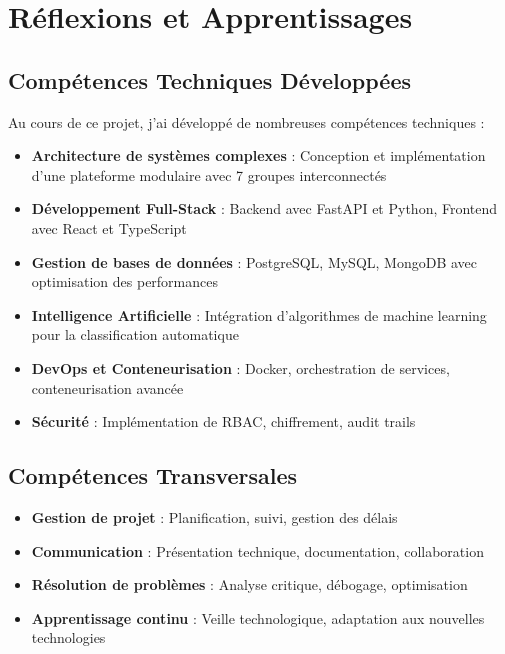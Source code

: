 \documentclass[12pt,a4paper]{article}
\begin{document}
\section{Réflexions et Apprentissages}

\subsection{Compétences Techniques Développées}
Au cours de ce projet, j'ai développé de nombreuses compétences techniques :

\begin{itemize}
    \item \textbf{Architecture de systèmes complexes} : Conception et implémentation d'une plateforme modulaire avec 7 groupes interconnectés
    \item \textbf{Développement Full-Stack} : Backend avec FastAPI et Python, Frontend avec React et TypeScript
    \item \textbf{Gestion de bases de données} : PostgreSQL, MySQL, MongoDB avec optimisation des performances
    \item \textbf{Intelligence Artificielle} : Intégration d'algorithmes de machine learning pour la classification automatique
    \item \textbf{DevOps et Conteneurisation} : Docker, orchestration de services, conteneurisation avancée
    \item \textbf{Sécurité} : Implémentation de RBAC, chiffrement, audit trails
\end{itemize}

\subsection{Compétences Transversales}
\begin{itemize}
    \item \textbf{Gestion de projet} : Planification, suivi, gestion des délais
    \item \textbf{Communication} : Présentation technique, documentation, collaboration
    \item \textbf{Résolution de problèmes} : Analyse critique, débogage, optimisation
    \item \textbf{Apprentissage continu} : Veille technologique, adaptation aux nouvelles technologies
\end{itemize}
\end{document}

